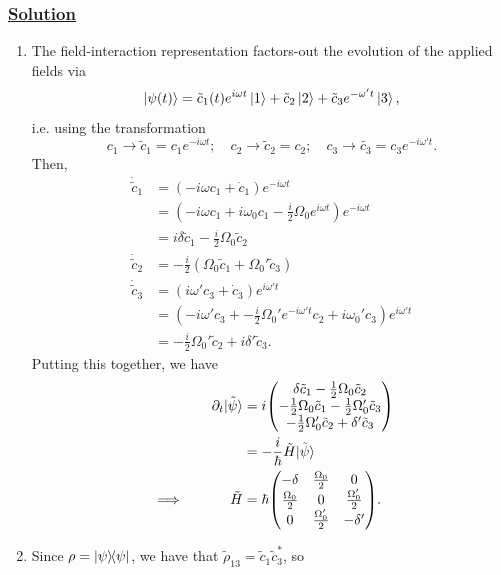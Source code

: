 \documentclass[12pt]{article}
\begin{document}
\subsubsection*{\underline{Solution}}
\begin{enumerate}[label=(\alph*)]
    \item The field-interaction representation factors-out the evolution of the applied fields via
    \[ \ket{\psi(t)} = \tilde{c}_1(t)e^{i\omega t}\ket{1} + \tilde{c}_2\ket{2} + \tilde{c}_3e^{-\omega't}\ket{3}, \]
    i.e. using the transformation
    \[ c_1 \to \tilde{c}_1 = c_1e^{-i\omega t}; \quad c_2 \to \tilde{c}_2 = c_2; \quad c_3 \to \tilde{c_3} = c_3e^{-i\omega't}. \]
    Then,
    \begin{align*}
        \dot{\tilde{c}}_1 &= \left(-i\omega c_1 + \dot{c}_1\right)e^{-i\omega t} \\
        &= \left(-i\omega c_1 + i\omega_0c_1 - \frac{i}{2}\Omega_0e^{i\omega t}\right)e^{-i\omega t} \\
        &= i\delta\tilde{c}_1 - \frac{i}{2}\Omega_0\tilde{c}_2 \\
        \dot{\tilde{c}}_2 &= -\frac{i}{2}\left(\Omega_0\tilde{c}_1 + \Omega_0'\tilde{c}_3\right) \\
        \dot{\tilde{c}}_3 &= \left(i\omega'c_3 + \dot{c}_3\right)e^{i\omega't} \\
        &= \left(-i\omega'c_3 + -\frac{i}{2}\Omega_0'e^{-i\omega't}c_2 + i\omega_0'c_3\right)e^{i\omega't} \\
        &= -\frac{i}{2}\Omega_0' \tilde{c}_2 + i\delta'\tilde{c}_3.
    \end{align*}
    Putting this together, we have
    \begin{alignat*}{3}
        &\quad & \partial_t \tilde{\ket{\psi}} &= i\mqty(\delta\tilde{c}_1 - \frac{1}{2}\Omega_0\tilde{c}_2 \\ -\frac{1}{2}\Omega_0\tilde{c}_1 - \frac{1}{2}\Omega_0'\tilde{c}_3 \\ -\frac{1}{2}\Omega_0'\tilde{c}_2 + \delta'\tilde{c}_3) \\
        &\quad & &= -\frac{i}{\hbar}\tilde{H}\tilde{\ket{\psi}} \\
        &\implies\quad & \tilde{H} &= \hbar\mqty(-\delta & \frac{\Omega_0}{2} & 0 \\ \frac{\Omega_0}{2} & 0 & \frac{\Omega_0'}{2} \\ 0 & \frac{\Omega_0'}{2} & -\delta').
    \end{alignat*}
    \item Since $\rho = \dyad{\psi}$, we have that $\tilde{\rho}_{13} = \tilde{c}_1\tilde{c}_3^*$, so

\end{enumerate}
\end{document}
